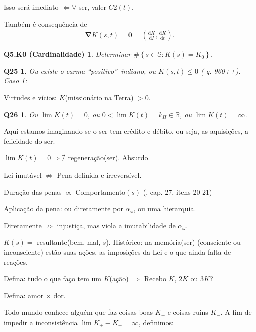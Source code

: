 \documentclass[12pt,a4paper]{article}
\begin{document}
			Isso ser\'a imediato $ \Leftarrow \forall $ ser, valer $C2(t)$.

			Tamb\'em \'e consequ\^encia de
			\begin{align*}
				\mathbf{\nabla} K(s,t) = \mathbf{0} = \left(\frac{\mathrm{d}K}{\mathrm{d}I}, \frac{\mathrm{d}K}{\mathrm{d}t}\right).
			\end{align*}

			\newtheorem{Q5.K0}{Q5.K0 (Cardinalidade)}
			\begin{Q5.K0} Determinar $ \#\left\{s \in \mathbb{S} : K(s) = K_0 \right\}$.
			\end{Q5.K0}

			\newtheorem{Q25}{Q25}
			\begin{Q25} Ou existe o carma \textquotedblleft positivo\textquotedblright\, indiano, ou $ K(s, t) \le 0 $ (\cite{le} q. 960++). Caso 1:
			\end{Q25}

			Virtudes e v\'icios: $K$(mission\'ario na Terra\cite{Terra}) $ > 0$.

			\newtheorem{Q26}{Q26}
			\begin{Q26} Ou $ \lim K(t) = 0 $, ou $ 0 < \lim K(t) = k_\Pi \in \mathbb{R} $, ou $ \lim K(t) = \infty $.
			\end{Q26}

			Aqui estamos imaginando se o ser tem cr\'edito e d\'ebito, ou seja, as aquisi\c{c}\~oes, a felicidade do ser.

			$ \lim K(t) = 0 \Rightarrow \nexists $ regenera\c{c}\~ao(ser). Absurdo.

			Lei imut\'avel $ \nRightarrow $ Pena definida e irrevers\'ivel.

			Dura\c{c}\~ao das penas $ \propto $ Comportamento$(s)$ (\cite{ese}, cap. 27, itens 20-21)

			Aplica\c{c}\~ao da pena: ou diretamente por $\alpha_\omega$, ou uma hierarquia.

			Diretamente $\nRightarrow$ injusti\c{c}a, mas viola a imutabilidade de $\alpha_\omega$.

			$K(s) = $ resultante(bem, mal, $s$). Hist\'orico: na mem\'oria(ser) (consciente ou inconsciente\cite{Freud}) est\~ao suas a\c{c}\~oes, as imposi\c{c}\~oes da Lei e o que ainda falta de rea\c{c}\~oes.

			Defina: tudo o que fa\c{c}o tem um $K$(a\c{c}\~ao) $\Rightarrow$ Recebo $K$, $2K$ ou $3K$?

			Defina: amor $\times$ dor.

			Todo mundo conhece algu\'em que faz coisas boas $K_+$ e coisas ruins $K_-$. A fim de impedir a inconsist\^encia $\lim K_+ - K_- = \infty$, definimos:
\end{document}
